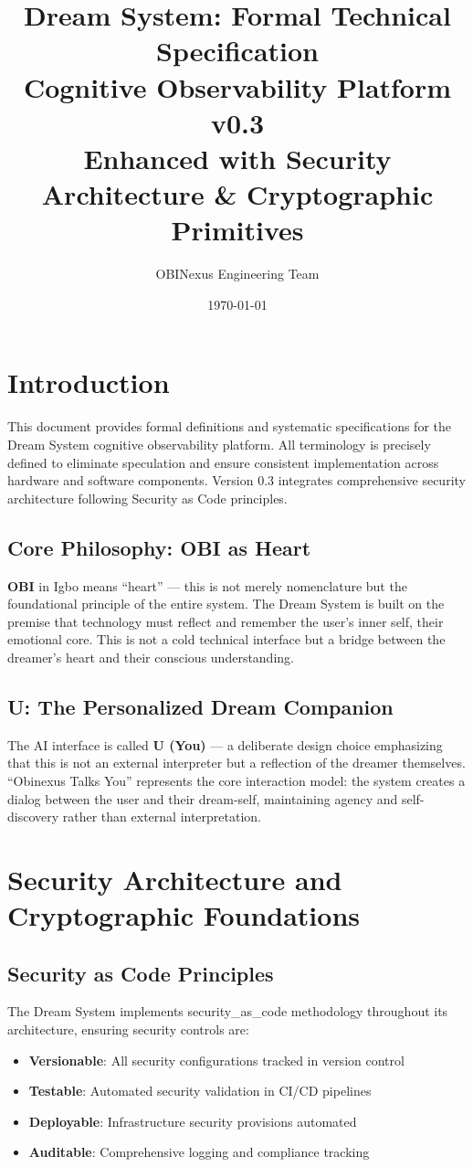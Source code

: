 \documentclass[12pt,a4paper]{article}
\title{Dream System: Formal Technical Specification\\
\large Cognitive Observability Platform v0.3\\
\normalsize Enhanced with Security Architecture \& Cryptographic Primitives}
\author{OBINexus Engineering Team}
\date{\today}
\begin{document}
\maketitle
\tableofcontents
\newpage

\section{Introduction}
This document provides formal definitions and systematic specifications for the Dream System cognitive observability platform. All terminology is precisely defined to eliminate speculation and ensure consistent implementation across hardware and software components. Version 0.3 integrates comprehensive security architecture following Security as Code principles.

\subsection{Core Philosophy: OBI as Heart}
\textbf{OBI} in Igbo means ``heart'' — this is not merely nomenclature but the foundational principle of the entire system. The Dream System is built on the premise that technology must reflect and remember the user's inner self, their emotional core. This is not a cold technical interface but a bridge between the dreamer's heart and their conscious understanding.

\subsection{U: The Personalized Dream Companion}
The AI interface is called \textbf{U (You)} — a deliberate design choice emphasizing that this is not an external interpreter but a reflection of the dreamer themselves. ``Obinexus Talks You'' represents the core interaction model: the system creates a dialog between the user and their dream-self, maintaining agency and self-discovery rather than external interpretation.

\section{Security Architecture and Cryptographic Foundations}

\subsection{Security as Code Principles}

The Dream System implements \gls{security_as_code} methodology throughout its architecture, ensuring security controls are:
\begin{itemize}
    \item \textbf{Versionable}: All security configurations tracked in version control
    \item \textbf{Testable}: Automated security validation in CI/CD pipelines
    \item \textbf{Deployable}: Infrastructure security provisions automated
    \item \textbf{Auditable}: Comprehensive logging and compliance tracking
\end{itemize}
\end{document}
